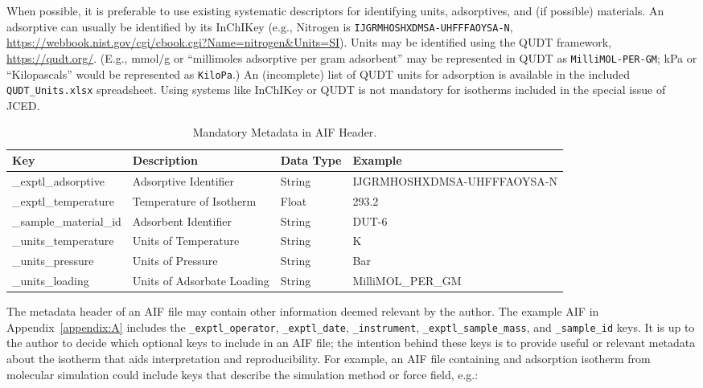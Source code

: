 \documentclass[preprint,pre,showkeys,12pt,superscriptaddress,nofootinbib,endfloats*]{revtex4-1}
\begin{document}
When possible, it is preferable to use existing systematic descriptors for identifying units, adsorptives, and (if possible) materials. An adsorptive can usually be identified by its InChIKey (e.g., Nitrogen is \verb!IJGRMHOSHXDMSA-UHFFFAOYSA-N!, \url{https://webbook.nist.gov/cgi/cbook.cgi?Name=nitrogen&Units=SI}). Units may be identified using the QUDT framework, \url{https://qudt.org/}. (E.g., mmol/g or ``millimoles adsorptive per gram adsorbent'' may be represented in QUDT as \verb!MilliMOL-PER-GM!; kPa or ``Kilopascals'' would be represented as \verb!KiloPa!.) An (incomplete) list of QUDT units for adsorption is available in the included \verb!QUDT_Units.xlsx! spreadsheet. Using systems like InChIKey or QUDT is not mandatory for isotherms included in the special issue of JCED.

\begin{table}%
  \begin{center}
    \label{tab:meta_req}
    \begin{tabular}{l|l|l|l}
      \textbf{Key} & \textbf{Description} & \textbf{Data Type} & \textbf{Example}\\
      \hline
      \_exptl\_adsorptive & Adsorptive Identifier & String & IJGRMHOSHXDMSA-UHFFFAOYSA-N \\
      \_exptl\_temperature & Temperature of Isotherm & Float & 293.2 \\
      \_sample\_material\_id & Adsorbent Identifier & String & DUT-6 \\
      \_units\_temperature & Units of Temperature & String & K \\
      \_units\_pressure & Units of Pressure & String & Bar \\
      \_units\_loading & Units of Adsorbate Loading & String & MilliMOL\_PER\_GM \\
    \end{tabular}
    \caption{Mandatory Metadata in AIF Header.}
  \end{center}
\end{table}

The metadata header of an AIF file may contain other information deemed relevant by the author. The example AIF in Appendix~\ref{appendix:A} includes the \verb!_exptl_operator!, \verb!_exptl_date!, \verb!_instrument!, \verb!_exptl_sample_mass!, and \verb!_sample_id! keys. It is up to the author to decide which optional keys to include in an AIF file; the intention behind these keys is to provide useful or relevant metadata about the isotherm that aids interpretation and reproducibility. For example, an AIF file containing and adsorption isotherm from molecular simulation could include keys that describe the simulation method or force field, e.g.:\newline
\end{document}
